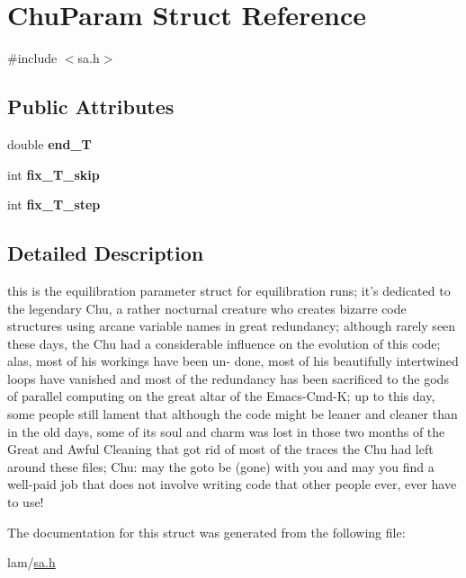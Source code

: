 \hypertarget{structChuParam}{
\section{ChuParam Struct Reference}
\label{structChuParam}
}


{\ttfamily \#include $<$sa.h$>$}\subsection*{Public Attributes}
\begin{DoxyCompactItemize}
\item 
\hypertarget{structChuParam_a43080d4a59d22f48db71c6a13c0f9098}{
double {\bfseries end\_\-T}}
\label{structChuParam_a43080d4a59d22f48db71c6a13c0f9098}

\item 
\hypertarget{structChuParam_a9cc9ad30f70323704b7607a09fb60466}{
int {\bfseries fix\_\-T\_\-skip}}
\label{structChuParam_a9cc9ad30f70323704b7607a09fb60466}

\item 
\hypertarget{structChuParam_aef71bf4e63d6047d440600c7b1536908}{
int {\bfseries fix\_\-T\_\-step}}
\label{structChuParam_aef71bf4e63d6047d440600c7b1536908}

\end{DoxyCompactItemize}


\subsection{Detailed Description}
this is the equilibration parameter struct for equilibration runs; it's dedicated to the legendary Chu, a rather nocturnal creature who creates bizarre code structures using arcane variable names in great redundancy; although rarely seen these days, the Chu had a considerable influence on the evolution of this code; alas, most of his workings have been un-\/ done, most of his beautifully intertwined loops have vanished and most of the redundancy has been sacrificed to the gods of parallel computing on the great altar of the Emacs-\/Cmd-\/K; up to this day, some people still lament that although the code might be leaner and cleaner than in the old days, some of its soul and charm was lost in those two months of the Great and Awful Cleaning that got rid of most of the traces the Chu had left around these files; Chu: may the goto be (gone) with you and may you find a well-\/paid job that does not involve writing code that other people ever, ever have to use! 

The documentation for this struct was generated from the following file:\begin{DoxyCompactItemize}
\item 
lam/\hyperlink{sa_8h}{sa.h}\end{DoxyCompactItemize}
